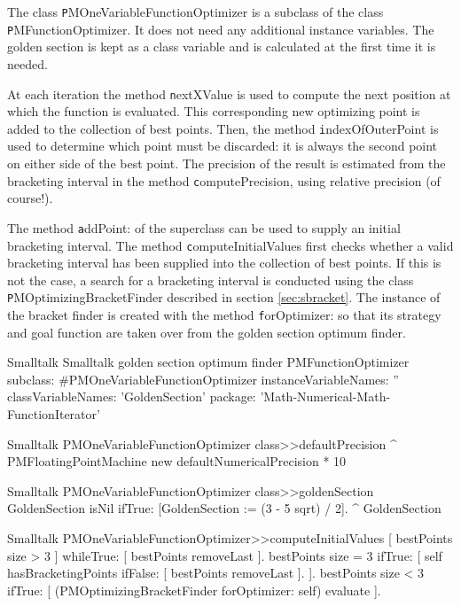 The class {\texttt PMOneVariableFunctionOptimizer} is a subclass of
the class {\texttt PMFunctionOptimizer}. It does not need any additional
instance variables. The golden section is kept as a class variable
and is calculated at the first time it is needed.

At each iteration the method {\texttt nextXValue} is used to compute
the next position at which the function is evaluated. This
corresponding new optimizing point is added to the collection of
best points. Then, the method {\texttt indexOfOuterPoint} is used to
determine which point must be discarded: it is always the second
point on either side of the best point. The precision of the
result is estimated from the bracketing interval in the method
{\texttt computePrecision}, using relative precision (of course!).

The method {\texttt addPoint:} of the superclass can be used to supply
an initial bracketing interval. The method {\texttt
computeInitialValues} first checks whether a valid bracketing
interval has been supplied into the collection of best points. If
this is not the case, a search for a bracketing interval is
conducted using the class {\texttt PMOptimizingBracketFinder}
described in section \ref{sec:sbracket}. The instance of the
bracket finder is created with the method {\texttt forOptimizer:} so
that its strategy and goal function are taken over from the golden
section optimum finder.

\begin{listing}[label=ls:optimizerOneDim]{Smalltalk}
{Smalltalk golden section optimum finder}
PMFunctionOptimizer subclass: #PMOneVariableFunctionOptimizer
   instanceVariableNames: ''
   classVariableNames: 'GoldenSection'
   package: 'Math-Numerical-Math-FunctionIterator'
\end{listing}

\begin{displaycode}{Smalltalk}
PMOneVariableFunctionOptimizer class>>defaultPrecision
    ^ PMFloatingPointMachine new defaultNumericalPrecision * 10
\end{displaycode}

\begin{displaycode}{Smalltalk}
PMOneVariableFunctionOptimizer class>>goldenSection
    GoldenSection isNil ifTrue: [GoldenSection := (3 - 5 sqrt) / 2].
    ^ GoldenSection
\end{displaycode}

\begin{displaycode}{Smalltalk}
PMOneVariableFunctionOptimizer>>computeInitialValues
    [ bestPoints size  > 3 ] whileTrue: [ bestPoints removeLast ].
    bestPoints size = 3
        ifTrue: [ self hasBracketingPoints
                    ifFalse: [ bestPoints removeLast ].
                ].
    bestPoints size < 3
        ifTrue: [ (PMOptimizingBracketFinder forOptimizer: self) evaluate ].
\end{displaycode}

